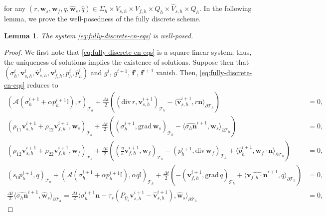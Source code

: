 \documentclass[10pt,a4paper]{amsart}
\newtheorem{lemma}{Lemma}
\newcommand{\Ael}{\mathcal{A}} %
\newcommand{\Id}{\mathbb{I}} %
\newcommand{\Thprod}[2]{( #1, #2 )_{\mathcal{T}_h}}
\newcommand{\divergence}{\mathrm{div}\,}
\newcommand{\grad}{\mathrm{grad}\,}
\newcommand{\pThprod}[2]{\langle #1, #2 \rangle_{\partial \mathcal{T}_{h}}}
\newcommand{\vect}[1]{\mathbf{#1}}
\begin{document}
for any $(r, \vect{w}_s, \vect{w}_f, q, \widehat{\vect{w}}_s, \widehat{q}) \in \Sigma_{h} \times V_{s,h} \times V_{f,h} \times Q_{h} \times \widehat{V}_{s,h}\times \widehat{Q}_{h}$. In the following lemma, we prove the well-posedness of the fully discrete scheme.
%
\begin{lemma}
	The system \eqref{eq:fully-discrete-cn-eqs} is well-posed.
\end{lemma}
%
\begin{proof}
	We first note that \eqref{eq:fully-discrete-cn-eqs} is a square linear system; thus, the uniqueness of solutions implies the existence of solutions. 
	Suppose then that $(\sigma_h^i, \vect{v}_{s,h}^i, \widehat{\vect{v}}_{s,h}^i, \vect{v}_{f,h}^i, p_h^i, \widehat{p}_h^i)$ and $g^i$, $g^{i+1}$, $\vect{f}^{i}$, $\vect{f}^{i+1}$ vanish. Then, \eqref{eq:fully-discrete-cn-eqs} reduces to 
		\begin{align*}
			\Thprod{\Ael(\sigma_{h}^{i+1} + \alpha {p}_{h}^{i+1} \Id)}{r} +\frac{\Delta t}{2} (\Thprod{\divergence r}{\vect{v}_{s,h}^{i+1}} -\pThprod{\widehat{\vect{v}}_{s,h}^{i+1}}{r \vect{n}})& = 0 ,
			\\ 
			\Thprod{\rho_{11}{\vect{v}}_{s,h}^{i+1} +\rho_{12}{\vect{v}}_{f,h}^{i+1}}{\vect{w}_{s}} + \frac{\Delta t}{2}\left(\Thprod{\sigma_{h}^{i+1}}{\grad \vect{w}_{s}} 
			- \pThprod{\widehat{\sigma_{h} \vect{n}}^{i+1} }{\vect{w}_{s}}\right)& = 0, 
			\\
			\Thprod{\rho_{12}{\vect{v}}_{s,h}^{i+1}+\rho_{22}{\vect{v}}_{f,h}^{i+1}}{\vect{w}_{f}} + \frac{\Delta t}{2}\left(\Thprod{\frac{\eta}{\kappa} \vect{v}_{f,h}^{i+1}}{\vect{w}_{f}} 
			- \Thprod{p_{h}^{i+1} }{\divergence\vect{w}_{f}} +\pThprod{\widehat{p}_{h}^{i+1}}{\vect{w}_{f}\cdot\vect{n}}\right) &= 0, 
			\\
			\Thprod{s_{0}{p}_{h}^{i+1}}{q} + \Thprod{\Ael({\sigma}_{h}^{i+1}+\alpha {p}_{h}^{i+1}\Id)}{\alpha q\Id} + \frac{\Delta t}{2} \left(-\Thprod{\vect{v}_{f,h}^{i+1}}{\grad q} 
			+ \pThprod{\widehat{\vect{v}_{f,h}\cdot \vect{n}}^{i+1}}{q}\right) &= 0,
			\\
			\frac{\Delta t}{2}\pThprod{\widehat{\sigma_h \vect{n}}^{i+1} }{\widehat{\vect{w}}_{s}}=
			\frac{\Delta t}{2}\pThprod{\sigma_h^{i+1} \vect{n} - \tau_{s} (P_{\widehat{V}_s} \vect{v}_{s,h}^{i+1} - \widehat{\vect{v}}_{s,h}^{i+1})}{\widehat{\vect{w}}_{s}} &= 0, 

\end{align*}
\end{proof}
\end{document}
